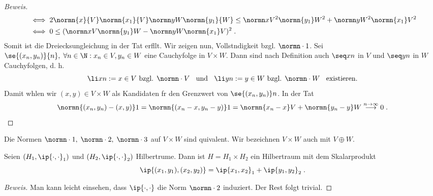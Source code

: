\begin{theorem}
\begin{proof}[Beweis]
\begin{align*}
	&\iff 2 \normn{x}{V}\normn{x_1}{V} \normn yW \normn{y_1}{W} \leq \normn xV^2 \normn{y_1}W^2 + \normn yW^2 \normn{x_1}V^2\\ 
	&\iff 0 \leq  (\normn xV \normn{y_1}W - \normn yW \normn{x_1}V)^2\;.
	\end{align*}
	Somit ist die Dreiecksungleichung in der Tat erf\us llt. Wir zeigen nun, Vollst\as ndigkeit bzgl. \(\normn\cdot 1\). Sei \(\se{(x_n, y_n)}{n},
	\; \forall n\in \N: x_n \in V, y_n \in W\) eine Cauchyfolge in \(V\times W\). Dann sind nach Definition auch \(\seq xn\) in $V$ und \(\seq yn\) in $W$ Cauchyfolgen, d. h. 
	\[\li xn := x \in V\text{ bzgl. } \normn\cdot V \;\;\text{ und }\;\;\li yn := y \in W\text{ bzgl. } \normn\cdot W \;\;\text{ existieren.}\]
	Damit w\as hlen wir \((x,y) \in V\times W\) als Kandidaten f\us r den Grenzwert von \(\se{(x_n, y_n)}n\). In der Tat
	\[\normn{(x_n, y_n) - (x,y)}1 = \normn{(x_n - x, y_n -y)}1 = \normn{x_n -x}V + \normn{y_n - y}W \overset{n\to\infty}{\longrightarrow} 0 \;.\]
\end{proof}
\begin{rem}
	Die Normen \(\normn\cdot 1,\;\normn\cdot 2,\; \normn\cdot 3\) auf \(V\times W\) sind 
	\as quivalent. Wir bezeichnen \(V\times W\) auch mit \(V\oplus W\).
\end{rem}

\begin{theorem}
	Seien \((H_1, \ip{\cdot, \cdot}_1)\) und \((H_2, \ip{\cdot, \cdot}_2)\) Hilbertr\as ume. 
	Dann ist \(H = H_1 \times H_2\) ein Hilbertraum mit dem Skalarprodukt
	\[\ip{(x_1,y_1), (x_2,y_2)} = \ip{x_1,x_2}_1 + \ip{y_1,y_2}_2\;.\]
\end{theorem}
\begin{proof}[Beweis]
	\happybegin
	Man kann leicht einsehen, dass \(\ip{\cdot,\cdot}\) die Norm \(\normn\cdot 2 \) induziert. Der Rest folgt trivial.\happyend
\end{proof}


\end{theorem}
